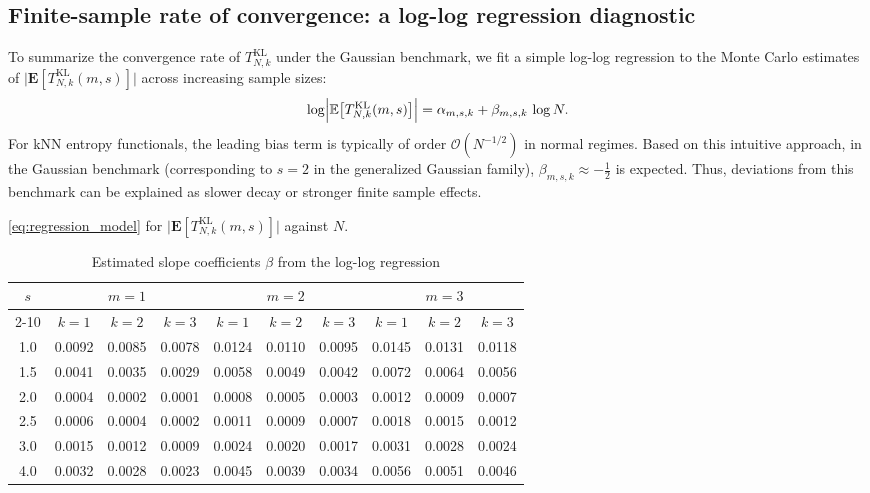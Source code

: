 \documentclass[12pt,a4paper]{article}
\newcommand{\E}{\mathbf {E}}
\theoremstyle{definition}
\theoremstyle{plain}
\begin{document}
{\subsection{Finite-sample rate of convergence: a log-log regression diagnostic}
\label{subsec:convergence_rate}

To summarize the convergence rate of $T_{N,k}^{\mathrm{KL}}$ under the Gaussian  benchmark, we fit a simple log-log regression to the Monte Carlo estimates of
$\bigl|\E[T_{N,k}^{\mathrm{KL}}(m,s)]\bigr|$ across increasing sample sizes:
\begin{equation}
\label{eq:regression_model}
\log \Bigl|\mathbb{E}\bigl[T_{N,k}^{\mathrm{KL}}(m,s)\bigr]\Bigr|
= \alpha_{m,s,k} + \beta_{m,s,k}\,\log N.
\end{equation}
For kNN entropy functionals, the leading bias term is typically of order $\mathcal{O}(N^{-1/2})$ in normal regimes. Based on this intuitive approach, in the Gaussian benchmark (corresponding to $s=2$ in the generalized Gaussian family), $\beta_{m,s,k}\approx -\tfrac12$ is expected. Thus, deviations from this benchmark can be explained as slower decay or stronger finite sample effects.

\begin{table}[t]
\centering
\small
\renewcommand\arraystretch{1.3}
\caption{Estimated slope coefficients $\beta$ from the log-log regression}
\eqref{eq:regression_model} for $\bigl|\E[T_{N,k}^{\mathrm{KL}}(m,s)]\bigr|$ against $N$.
\label{table:kl-convergence-slopes}
\begin{tabular*}{\textwidth}{@{\extracolsep{\fill}}c|ccc|ccc|ccc}
\toprule
\multirow{2}{*}{$s$} & \multicolumn{3}{c|}{$m = 1$} & \multicolumn{3}{c|}{$m = 2$} & \multicolumn{3}{c}{$m = 3$} \\
\cline{2-10}
 & $k = 1$ & $k = 2$ & $k = 3$ & $k = 1$ & $k = 2$ & $k = 3$ & $k = 1$ & $k = 2$ & $k = 3$ \\
\midrule
1.0 & 0.0092 & 0.0085 & 0.0078 & 0.0124 & 0.0110 & 0.0095 & 0.0145 & 0.0131 & 0.0118 \\
1.5 & 0.0041 & 0.0035 & 0.0029 & 0.0058 & 0.0049 & 0.0042 & 0.0072 & 0.0064 & 0.0056 \\
2.0 & 0.0004 & 0.0002 & 0.0001 & 0.0008 & 0.0005 & 0.0003 & 0.0012 & 0.0009 & 0.0007 \\
2.5 & 0.0006 & 0.0004 & 0.0002 & 0.0011 & 0.0009 & 0.0007 & 0.0018 & 0.0015 & 0.0012 \\
3.0 & 0.0015 & 0.0012 & 0.0009 & 0.0024 & 0.0020 & 0.0017 & 0.0031 & 0.0028 & 0.0024 \\
4.0 & 0.0032 & 0.0028 & 0.0023 & 0.0045 & 0.0039 & 0.0034 & 0.0056 & 0.0051 & 0.0046 \\
\bottomrule
\end{tabular*}
\end{table}

}
\end{document}
